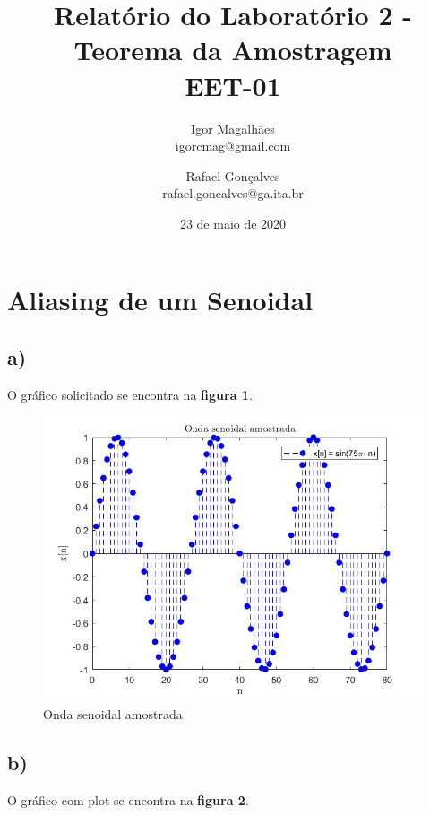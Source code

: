 \documentclass[a4paper, 12pt]{article}
\title{Relatório do Laboratório 2 - Teorema da Amostragem \\ EET-01}
\author{
  Igor Magalhães\\igorcmag@gmail.com
  \and
  Rafael Gonçalves\\rafael.goncalves@ga.ita.br
}
\date{23 de maio de 2020}
\begin{document}
\maketitle
\section{Aliasing de um Senoidal}

\subsection{a)}
O gráfico solicitado se encontra na \textbf{figura 1}.



\begin{figure}[H]
	\centering
	\includegraphics[scale=0.5]{../Imagens/ex1/a.jpg} 
	\caption{Onda senoidal amostrada}
	\label{fig:1a}
\end{figure}

\subsection{b)}

O gráfico com plot se encontra na \textbf{figura 2}.


\end{document}
